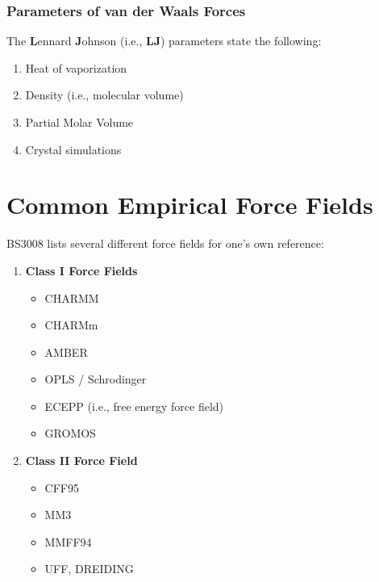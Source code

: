 \documentclass[
  letterpaper,
  DIV=11,
  numbers=noendperiod]{scrreprt}
\providecommand{\tightlist}{%
  \setlength{\itemsep}{0pt}\setlength{\parskip}{0pt}}\usepackage{longtable,booktabs,array}
\begin{document}
\hypertarget{parameters-of-van-der-waals-forces}{%
\subsubsection{Parameters of van der Waals
Forces}\label{parameters-of-van-der-waals-forces}}

The \textbf{L}ennard \textbf{J}ohnson (i.e., \textbf{LJ}) parameters
state the following:

\begin{enumerate}
\def\labelenumi{\arabic{enumi}.}
\tightlist
\item
  Heat of vaporization
\item
  Density (i.e., molecular volume)
\item
  Partial Molar Volume
\item
  Crystal simulations
\end{enumerate}

\hypertarget{common-empirical-force-fields}{%
\section{Common Empirical Force
Fields}\label{common-empirical-force-fields}}

BS3008 lists several different force fields for one's own reference:

\begin{enumerate}
\def\labelenumi{\arabic{enumi}.}
\item
  \textbf{Class I Force Fields}

  \begin{itemize}
  \tightlist
  \item
    CHARMM
  \item
    CHARMm
  \item
    AMBER
  \item
    OPLS / Schrodinger
  \item
    ECEPP (i.e., free energy force field)
  \item
    GROMOS
  \end{itemize}
\item
  \textbf{Class II Force Field}

  \begin{itemize}
  \tightlist
  \item
    CFF95
  \item
    MM3
  \item
    MMFF94
  \item
    UFF, DREIDING
  \end{itemize}
\end{enumerate}
\end{document}
